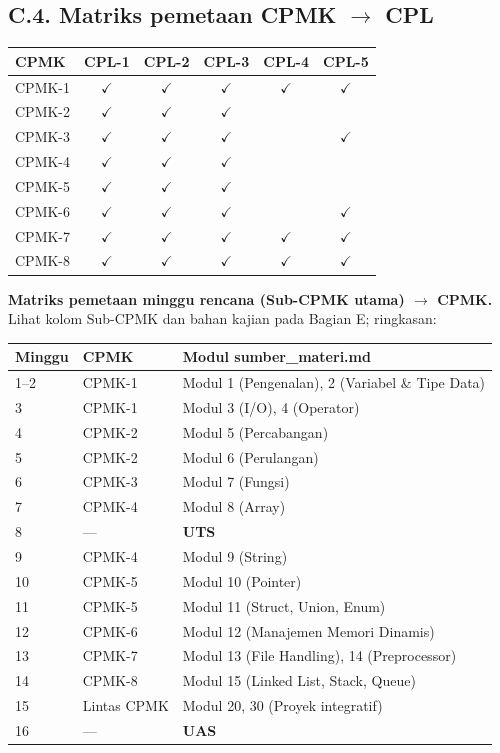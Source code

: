 \documentclass[12pt,a4paper]{article}
\begin{document}
\subsection*{C.4. Matriks pemetaan CPMK $\rightarrow$ CPL}

{\small
\begin{tabular}{|l|c|c|c|c|c|}
\hline
\textbf{CPMK} & \textbf{CPL-1} & \textbf{CPL-2} & \textbf{CPL-3} & \textbf{CPL-4} & \textbf{CPL-5} \\
\hline
CPMK-1 & $\checkmark$ & $\checkmark$ & $\checkmark$ & $\checkmark$ & $\checkmark$ \\
CPMK-2 & $\checkmark$ & $\checkmark$ & $\checkmark$ & & \\
CPMK-3 & $\checkmark$ & $\checkmark$ & $\checkmark$ & & $\checkmark$ \\
CPMK-4 & $\checkmark$ & $\checkmark$ & $\checkmark$ & & \\
CPMK-5 & $\checkmark$ & $\checkmark$ & $\checkmark$ & & \\
CPMK-6 & $\checkmark$ & $\checkmark$ & $\checkmark$ & & $\checkmark$ \\
CPMK-7 & $\checkmark$ & $\checkmark$ & $\checkmark$ & $\checkmark$ & $\checkmark$ \\
CPMK-8 & $\checkmark$ & $\checkmark$ & $\checkmark$ & $\checkmark$ & $\checkmark$ \\
\hline
\end{tabular}
}

\vspace{0.35cm}

\noindent\textbf{Matriks pemetaan minggu rencana (Sub-CPMK utama) $\rightarrow$ CPMK.} Lihat kolom Sub-CPMK dan bahan kajian pada Bagian E; ringkasan:

{\small
\begin{tabular}{|l|l|l|}
\hline
\textbf{Minggu} & \textbf{CPMK} & \textbf{Modul sumber\_materi.md} \\
\hline
1--2 & CPMK-1 & Modul 1 (Pengenalan), 2 (Variabel \& Tipe Data) \\
3 & CPMK-1 & Modul 3 (I/O), 4 (Operator) \\
4 & CPMK-2 & Modul 5 (Percabangan) \\
5 & CPMK-2 & Modul 6 (Perulangan) \\
6 & CPMK-3 & Modul 7 (Fungsi) \\
7 & CPMK-4 & Modul 8 (Array) \\
8 & --- & \textbf{UTS} \\
9 & CPMK-4 & Modul 9 (String) \\
10 & CPMK-5 & Modul 10 (Pointer) \\
11 & CPMK-5 & Modul 11 (Struct, Union, Enum) \\
12 & CPMK-6 & Modul 12 (Manajemen Memori Dinamis) \\
13 & CPMK-7 & Modul 13 (File Handling), 14 (Preprocessor) \\
14 & CPMK-8 & Modul 15 (Linked List, Stack, Queue) \\
15 & Lintas CPMK & Modul 20, 30 (Proyek integratif) \\
16 & --- & \textbf{UAS} \\
\hline
\end{tabular}
}
\end{document}
